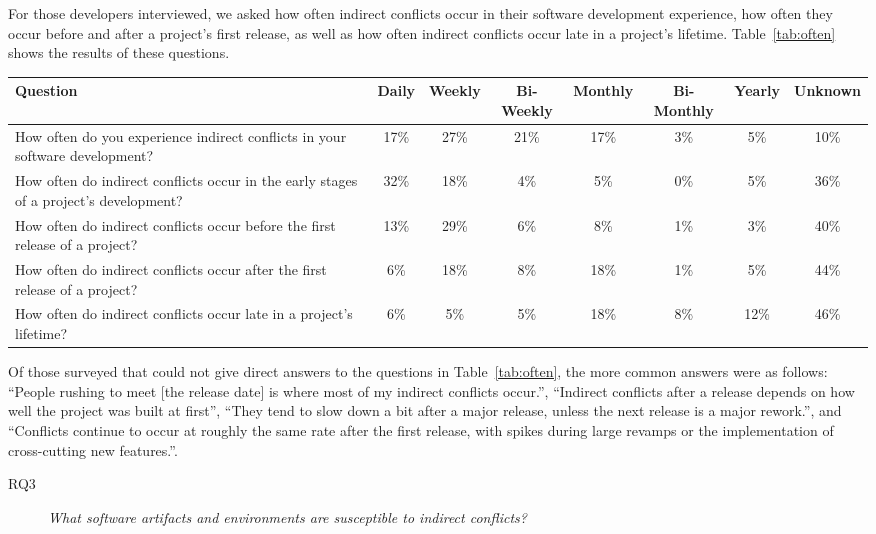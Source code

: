 \documentclass[conference]{IEEEtran}
\begin{document}
For those developers interviewed, we asked how often indirect conflicts occur in their software development experience,
how often they occur before and after a project's first release, as well as how often indirect conflicts occur late
in a project's lifetime. Table~\ref{tab:often} shows the results of these questions.

\begin{table*}[tb!]
\begin{center}
\begin{tabular}{| p{7cm} | c | c | c | c | c | c | c |}
\hline
Question & Daily & Weekly & Bi-Weekly & Monthly & Bi-Monthly & Yearly & Unknown \\
\hline
\hline
How often do you experience indirect conflicts in your software development? & 17\% & 27\% & 21\% & 17\% & 3\% & 5\% & 10\% \\ \hline
How often do indirect conflicts occur in the early stages of a project’s development? & 32\% & 18\% & 4\% & 5\% & 0\% & 5\% & 36\% \\ \hline
How often do indirect conflicts occur before the first release of a project? & 13\% & 29\% & 6\% & 8\% & 1\% & 3\% & 40\% \\ \hline
How often do indirect conflicts occur after the first release of a project? & 6\% & 18\% & 8\% & 18\% & 1\% & 5\% & 44\% \\ \hline
How often do indirect conflicts occur late in a project’s lifetime? & 6\% & 5\% & 5\% & 18\% & 8\% & 12\% & 46\% \\ \hline
\end{tabular}
\end{center}
\caption{Results of survey questions to how often indirect conflicts occur, in terms of percentage
of developers surveyed.\label{tab:often}}
\end{table*}

Of those surveyed that could not give direct answers to the questions in Table~\ref{tab:often}, the more common answers were 
as follows: ``People rushing to meet [the release date] is where most of my indirect conflicts occur.'', ``Indirect conflicts
after a release depends on how well the project was built at first'', ``They tend to slow down a bit after a major release, 
unless the next release is a major rework.'', and ``Conflicts continue to occur at roughly the same rate after the first release,
with spikes during large revamps or the implementation of cross-cutting new features.''.

\begin{description}
	\item[RQ3] \textit{What software artifacts and environments are susceptible to indirect conflicts?}
\end{description}
\end{document}
